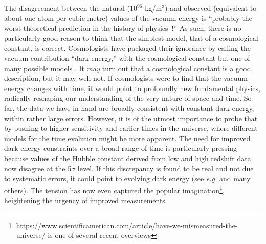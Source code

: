 \documentclass[11pt]{article}
\begin{document}
The disagreement between the natural ($10^{96}$ kg/m$^3$) and observed
(equivalent to about one atom per cubic metre) values of the vacuum
energy is ``probably the worst theoretical prediction in the history
of physics~\citep{Hobson06}!''  As such, there is no particularly good
reason to think that the simplest model, that of a cosmological
constant, is correct.  Cosmologists have packaged their ignorance by
calling the vacuum contribution ``dark energy,'' with the cosmological
constant but one of many possible models \citep{Ratra88,Steinhardt99}.
It {\textit{may}} turn out that a cosmological constant is a good
description, but it may well not.  If cosmologists were to find that
the vacuum energy changes with time, it would point to profoundly new
fundamental physics, radically reshaping our understanding of the very
nature of space and time.
So far, the data we have in-hand are broadly consistent with constant
dark energy, within rather large errors.  However, it is of the utmost
importance to probe that by pushing to higher sensitivity and earlier
times in the universe, where different models for the time evolution
might be more apparent.  The need for improved dark energy constraints
over a broad range of time is particularly pressing because
values of the Hubble constant derived from low and high redshift data
now disagree at the 5$\sigma$ level.  If this discrepancy is found to
be real and not due to systematic errors, it could point to evolving
dark energy (see {\it{e.g.}} \citet{Freedman2017} and many others).
The tension has now even captured the popular
imagination\footnote{https://www.scientificamerican.com/article/have-we-mismeasured-the-universe/
  is one of several recent overviews}, heightening the urgency of
improved measurements.


\end{document}
